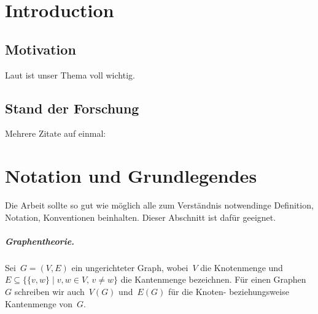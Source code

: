 \chapter{Introduction}\label{chap:introduction}

\newcommand{\vehiclecaps}{B}
\newcommand{\vehiclecap}{\beta}
\newcommand{\vehicetype}{v}
\newcommand{\soc}{q}
\newcommand{\places}{\mathcal{X}}
\newcommand{\depot}{\delta}
\newcommand{\depots}{D}
\newcommand{\trips}{\mathcal{T}}
\newcommand{\trip}{\tau}
\newcommand{\chargers}{\mathcal{C}}
\newcommand{\charges}{Z}
\newcommand{\timefunc}{T}
\newcommand{\energyfunc}{Q}
\newcommand{\numbervt}{m}
\newcommand{\chargefunc}{Q^C}
\newcommand{\charge}{\zeta}
\newcommand{\vehicleschedule}{\psi}
\newcommand{\schedule}{\Psi}
\newcommand{\evehicleschedule}{\omega}
\newcommand{\eschedule}{\Omega}
\newcommand{\departure}{d}
\newcommand{\arrival}{a}
\newcommand{\timestart}{s}
\newcommand{\timeend}{e}
\newcommand{\chargestation}{c}
\newcommand{\vehicletypes}{\mathcal{V}}




\section{Motivation}\label{sec:motivation}

Laut \citet{Nie06} ist unser Thema voll wichtig.

\section{Stand der Forschung}

Mehrere Zitate auf einmal: \citet{Nie06,GJ79,KN12}

\chapter{Notation und Grundlegendes}\label{ch:notation}
Die Arbeit sollte so gut wie möglich alle zum Verständnis notwendinge Definition, Notation, Konventionen beinhalten.
Dieser Abschnitt ist dafür geeignet.

\paragraph*{Graphentheorie.} 
Sei~$G=(V,E)$ ein ungerichteter Graph, wobei~$V$ die Knotenmenge und~$E\subseteq \{\{v,w\}\mid v,w\in V,\, v\neq w\}$ die Kantenmenge bezeichnen.
Für einen Graphen~$G$ schreiben wir auch~$V(G)$ und~$E(G)$ für die Knoten- beziehungsweise Kantenmenge von~$G$.

